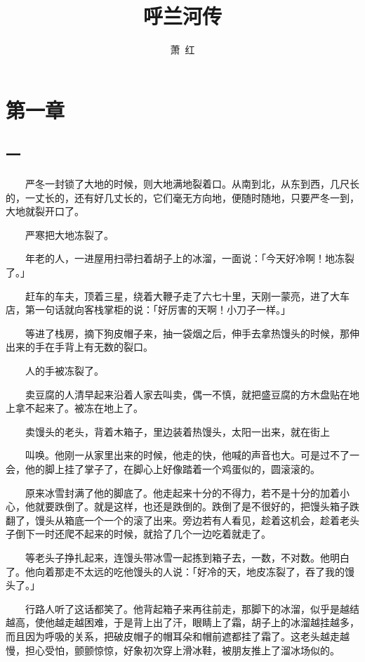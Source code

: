 \documentclass[UTF8]{ctexart}
\title{呼兰河传}
\author{萧\ 红}
\date{}
\begin{document}
\maketitle

\newpage

\section{第一章}

\subsection{一}

　　严冬一封锁了大地的时候，则大地满地裂着口。从南到北，从东到西，几尺长的，一丈长的，还有好几丈长的，它们毫无方向地，便随时随地，只要严冬一到，大地就裂开口了。

　　严寒把大地冻裂了。

　　年老的人，一进屋用扫帚扫着胡子上的冰溜，一面说：「今天好冷啊！地冻裂了。」

　　赶车的车夫，顶着三星，绕着大鞭子走了六七十里，天刚一蒙亮，进了大车店，第一句话就向客栈掌柜的说：「好厉害的天啊！小刀子一样。」

　　等进了栈房，摘下狗皮帽子来，抽一袋烟之后，伸手去拿热馒头的时候，那伸出来的手在手背上有无数的裂口。

　　人的手被冻裂了。

　　卖豆腐的人清早起来沿着人家去叫卖，偶一不慎，就把盛豆腐的方木盘贴在地上拿不起来了。被冻在地上了。

　　卖馒头的老头，背着木箱子，里边装着热馒头，太阳一出来，就在街上

　　叫唤。他刚一从家里出来的时候，他走的快，他喊的声音也大。可是过不了一会，他的脚上挂了掌子了，在脚心上好像踏着一个鸡蛋似的，圆滚滚的。

　　原来冰雪封满了他的脚底了。他走起来十分的不得力，若不是十分的加着小心，他就要跌倒了。就是这样，也还是跌倒的。跌倒了是不很好的，把馒头箱子跌翻了，馒头从箱底一个一个的滚了出来。旁边若有人看见，趁着这机会，趁着老头子倒下一时还爬不起来的时候，就拾了几个一边吃着就走了。

　　等老头子挣扎起来，连馒头带冰雪一起拣到箱子去，一数，不对数。他明白了。他向着那走不太远的吃他馒头的人说：「好冷的天，地皮冻裂了，吞了我的馒头了。」

　　行路人听了这话都笑了。他背起箱子来再往前走，那脚下的冰溜，似乎是越结越高，使他越走越困难，于是背上出了汗，眼睛上了霜，胡子上的冰溜越挂越多，而且因为呼吸的关系，把破皮帽子的帽耳朵和帽前遮都挂了霜了。这老头越走越慢，担心受怕，颤颤惊惊，好象初次穿上滑冰鞋，被朋友推上了溜冰场似的。
\end{document}
